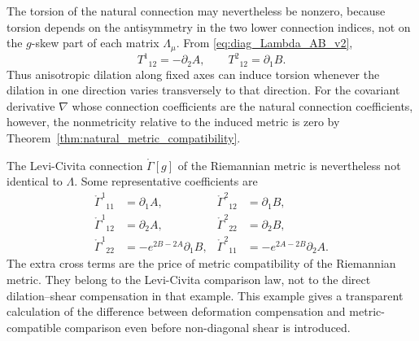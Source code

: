 \documentclass[12pt]{amsart}
\theoremstyle{definition}
\theoremstyle{remark}
\newcommand{\oconn}{\mathring{\Gamma}}
\begin{document}
The torsion of the natural connection may nevertheless be nonzero, because torsion depends on the antisymmetry in the two lower connection indices, not on the $g$-skew part of each matrix $\Lambda_\mu$.  From \eqref{eq:diag_Lambda_AB_v2},
\begin{equation}\label{eq:diag_torsion_AB_v2}
 T^1{}_{12}=-\partial_2A,
 \qquad
 T^2{}_{12}=\partial_1B .
\end{equation}
Thus anisotropic dilation along fixed axes can induce torsion whenever the dilation in one direction varies transversely to that direction.  For the covariant derivative \(\nabla\) whose connection coefficients are the natural connection coefficients, however, the nonmetricity relative to the induced metric is zero by Theorem~\ref{thm:natural_metric_compatibility}.

The Levi-Civita connection \(\oconn[g]\) of the Riemannian metric is nevertheless not identical to \(\Lambda\).  Some representative coefficients are
\begin{align}\label{eq:diag_LC_coeffs_v2}
 \oconn^1{}_{11}&=\partial_1A,&
 \oconn^2{}_{12}&=\partial_1B,\\
 \oconn^1{}_{12}&=\partial_2A,&
 \oconn^2{}_{22}&=\partial_2B,\\
 \oconn^1{}_{22}&=-e^{2B-2A}\partial_1B,&
 \oconn^2{}_{11}&=-e^{2A-2B}\partial_2A.
\end{align}
The extra cross terms are the price of metric compatibility of the Riemannian metric.  They belong to the Levi-Civita comparison law, not to the direct dilation--shear compensation in that example.  This example gives a transparent calculation of the difference between deformation compensation and metric-compatible comparison even before non-diagonal shear is introduced.
\end{document}

